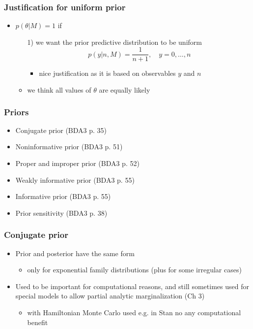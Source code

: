 \documentclass[english,t]{beamer}
\begin{document}
\begin{frame}
  \frametitle{Justification for uniform prior}

  \begin{itemize}
  \item $p(\theta|M)=1$ if
    \begin{itemize}
    \item[1)] we want the prior predictive distribution to be uniform
      \begin{equation*}
        p(y|n,M) = \frac{1}{n+1}, \quad y=0,\ldots,n
      \end{equation*}
      \begin{itemize}
      \item nice justification as it is based on observables $y$ and $n$
      \end{itemize}
     \item<2->[2)] we think all values of $\theta$ are equally likely
    \end{itemize} 
  \end{itemize}

\end{frame}


\begin{frame}
  \frametitle{Priors}

  \begin{itemize}
  \item Conjugate prior (BDA3 p. 35)
  \item Noninformative prior (BDA3 p. 51)
  \item Proper and improper prior (BDA3 p. 52)
  \item Weakly informative prior (BDA3 p. 55)
  \item Informative prior (BDA3 p. 55)
  \item Prior sensitivity (BDA3 p. 38)
  \end{itemize}

\end{frame}

\begin{frame}

  \frametitle{Conjugate prior}

  \begin{itemize}
  \item Prior and posterior have the same form
    \begin{itemize}
    \item only for exponential family distributions (plus for
      some irregular cases)
    \end{itemize}
  \item Used to be important for computational reasons, and still
    sometimes used for special models to allow partial analytic
    marginalization (Ch 3)
    \begin{itemize}
    \item with Hamiltonian Monte Carlo used e.g. in Stan no any
      computational benefit
    \end{itemize}
  \end{itemize}
  
\end{frame}
\end{document}
